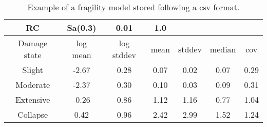 \begin {table}[htb]
\caption{Example of a fragility model stored following a csv format.}
\label{table:ff_csv}
\begin{center}
  \begin{tabular}{ | c | c | c | c | c | c | c |}
  \hline
RC & Sa(0.3) & 0.01 & 1.0 &  &  &  \\ \hline
Damage state & log mean & log stddev & mean & stddev & median & cov \\ \hline
Slight & -2.67 & 0.28 & 0.07 & 0.02 & 0.07 & 0.29 \\ \hline
Moderate & -2.37 & 0.30 & 0.10 & 0.03 & 0.09 & 0.31 \\ \hline
Extensive & -0.26 & 0.86 & 1.12 & 1.16 & 0.77 & 1.04 \\ \hline
Collapse & 0.42 & 0.96 & 2.42 & 2.99 & 1.52 & 1.24 \\ \hline
  \end{tabular}
\end{center}
\end{table}



